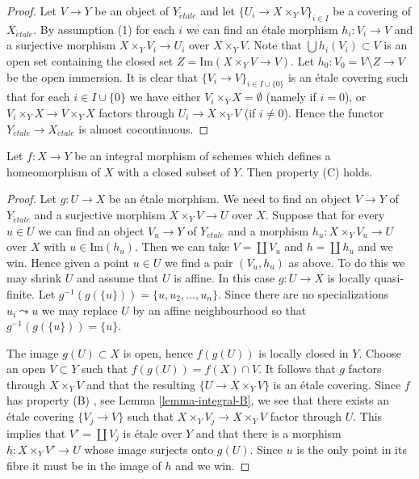 \begin{proof}
Let $V \to Y$ be an object of $Y_{\acute{e}tale}$ and let
$\{U_i \to X \times_Y V\}_{i \in I}$ be a covering of $X_{\acute{e}tale}$.
By assumption (1) for each $i$ we can find an \'etale morphism
$h_i : V_i \to V$ and a surjective morphism $X \times_Y V_i \to U_i$
over $X \times_Y V$. Note that $\bigcup h_i(V_i) \subset V$ is an
open set containing the closed set $Z = \text{Im}(X \times_Y V \to V)$.
Let $h_0 : V_0 = V \setminus Z \to V$ be the open immersion.
It is clear that $\{V_i \to V\}_{i \in I \cup \{0\}}$ is an
\'etale covering such that for each $i \in I \cup \{0\}$ we have
either $V_i \times_Y X = \emptyset$ (namely if $i = 0$), or
$V_i \times_Y X \to V \times_Y X$ factors through $U_i \to X \times_Y V$
(if $i \not = 0$). Hence the functor $Y_{\acute{e}tale} \to X_{\acute{e}tale}$
is almost cocontinuous.
\end{proof}

\begin{lemma}
\label{lemma-integral-homeo-onto-image-C}
Let $f : X \to Y$ be an integral morphism of schemes which defines
a homeomorphism of $X$ with a closed subset of $Y$.
Then property (C) holds.
\end{lemma}

\begin{proof}
Let $g : U \to X$ be an \'etale morphism. We need to find an object
$V \to Y$ of $Y_{\acute{e}tale}$ and a surjective morphism $X \times_Y V \to U$
over $X$. Suppose that for every $u \in U$ we can find an object
$V_u \to Y$ of $Y_{\acute{e}tale}$ and a morphism $h_u : X \times_Y V_u \to U$
over $X$ with $u \in \text{Im}(h_u)$. Then we can take $V = \coprod V_u$
and $h = \coprod h_u$ and we win. Hence given a point
$u \in U$ we find a pair $(V_u, h_u)$ as above. To do this we may
shrink $U$ and assume that $U$ is affine. In this case
$g : U \to X$ is locally quasi-finite. Let
$g^{-1}(g(\{u\})) = \{u, u_2, \ldots, u_n\}$. Since there are no
specializations $u_i \leadsto u$ we may replace $U$ by an affine neighbourhood
so that $g^{-1}(g(\{u\})) = \{u\}$.

\medskip\noindent
The image $g(U) \subset X$ is open,
hence $f(g(U))$ is locally closed in $Y$. Choose an open $V \subset Y$ such
that $f(g(U)) = f(X) \cap V$. It follows that $g$ factors through
$X \times_Y V$ and that the resulting $\{U \to X \times_Y V\}$ is an \'etale
covering. Since $f$ has property (B) , see
Lemma \ref{lemma-integral-B},
we see that there exists an \'etale covering $\{V_j \to V\}$ such that
$X \times_Y V_j \to X \times_Y V$ factor through $U$.
This implies that $V' = \coprod V_j$ is \'etale over $Y$ and that there is a
morphism $h : X \times_Y V' \to U$ whose image
surjects onto $g(U)$. Since $u$ is the only point in its fibre it must
be in the image of $h$ and we win.
\end{proof}

